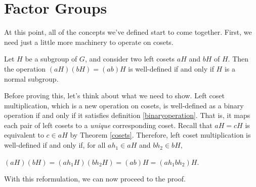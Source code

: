 \section{Factor Groups}

At this point, all of the concepts we've defined start to come together. First, we need just a little more machinery to operate on cosets.

\begin{theorem}
Let $H$ be a subgroup of $G$, and consider two left cosets $aH$ and $bH$ of $H$. Then the operation $(aH)(bH) = (ab)H$ is well-defined if and only if $H$ is a normal subgroup.
\end{theorem}

Before proving this, let's think about what we need to show. Left coset multiplication, which is a new operation on cosets, is well-defined as a binary operation if and only if it satisfies definition \ref{binaryoperation}. That is, it maps each pair of left cosets to a \textit{unique} corresponding coset. Recall that $aH = cH$ is equivalent to $c \in aH$ by Theorem \ref{cosets}. Therefore, left coset multiplication is well-defined if and only if, for all $ah_1 \in aH$ and $bh_2 \in bH$,

\begin{center}
    $(aH)(bH) = (ah_1H)(bh_2H) = (ab)H = (ah_1bh_2)H$.
\end{center}

With this reformulation, we can now proceed to the proof.

